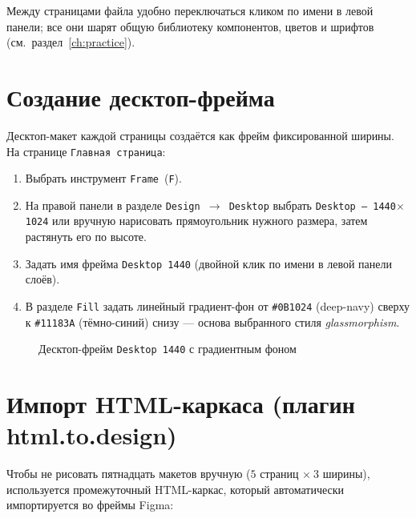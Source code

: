 Между страницами файла удобно переключаться кликом по имени в левой
панели; все они шарят общую библиотеку компонентов, цветов и шрифтов
(см.\ раздел~\ref{ch:practice}).

\section{Создание десктоп-фрейма}

Десктоп-макет каждой страницы создаётся как фрейм фиксированной ширины.
На странице \texttt{Главная страница}:
\begin{enumerate}
  \item Выбрать инструмент \texttt{Frame}~(\texttt{F}).
  \item На правой панели в разделе \texttt{Design~\(\rightarrow\)~Desktop}
        выбрать \texttt{Desktop~--~1440\(\times\)1024} или вручную
        нарисовать прямоугольник нужного размера, затем растянуть его
        по высоте.
  \item Задать имя фрейма \texttt{Desktop~1440} (двойной клик по имени
        в левой панели слоёв).
  \item В разделе \texttt{Fill} задать линейный градиент-фон от
        \texttt{\#0B1024} (deep-navy) сверху к \texttt{\#11183A}
        (тёмно-синий) снизу --- основа выбранного стиля
        \emph{glassmorphism}.
\end{enumerate}

\begin{figure}[h]
  \centering
  \caption{Десктоп-фрейм \texttt{Desktop~1440} с градиентным фоном}
  \label{fig:frame_1440}
\end{figure}

\section{Импорт HTML-каркаса (плагин html.to.design)}

Чтобы не рисовать пятнадцать макетов вручную (\(5\) страниц
\(\times~3\) ширины), используется промежуточный HTML-каркас, который
автоматически импортируется во фреймы Figma:

